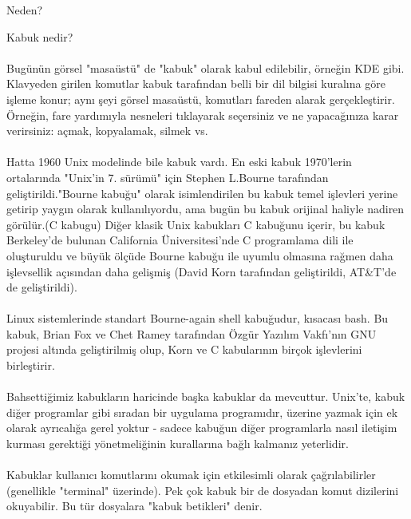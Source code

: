 \documentclass[10pt,a5paper]{book}
\begin{document}
\begin{section}{Neden?}
\begin{subsection}{Kabuk nedir?}
\paragraph{}{Bugünün görsel "masaüstü" de "kabuk" olarak kabul edilebilir, örneğin KDE gibi. Klavyeden girilen komutlar kabuk tarafından belli bir dil bilgisi kuralına göre işleme konur; aynı şeyi görsel masaüstü, komutları fareden alarak gerçekleştirir. Örneğin, fare yardımıyla nesneleri tıklayarak seçersiniz ve ne yapacağınıza karar verirsiniz: açmak, kopyalamak, silmek vs.}
\paragraph{}{Hatta 1960 Unix modelinde bile kabuk vardı. En eski kabuk 1970'lerin ortalarında "Unix'in 7. sürümü" için Stephen L.Bourne tarafından geliştirildi."Bourne kabuğu" olarak isimlendirilen bu kabuk temel işlevleri yerine getirip yaygın olarak kullanılıyordu, ama bugün bu kabuk orijinal haliyle nadiren görülür.(C kabugu) Diğer klasik Unix kabukları C kabuğunu içerir, bu kabuk Berkeley'de bulunan California Üniversitesi'nde C programlama dili ile oluşturuldu ve büyük ölçüde Bourne kabuğu ile uyumlu olmasına rağmen daha işlevsellik açısından daha gelişmiş (David Korn tarafından geliştirildi, AT\&T'de de geliştirildi).}
\paragraph{}{Linux sistemlerinde standart Bourne-again shell kabuğudur, kısacası bash. Bu kabuk, Brian Fox ve Chet Ramey tarafından Özgür Yazılım Vakfı'nın GNU projesi altında geliştirilmiş olup, Korn ve C kabularının birçok işlevlerini
birleştirir.}
\paragraph{}{Bahsettiğimiz kabukların haricinde başka kabuklar da mevcuttur. Unix'te, kabuk diğer programlar gibi sıradan bir uygulama programıdır,
üzerine yazmak için ek olarak ayrıcalığa gerel yoktur - sadece kabuğun diğer programlarla nasıl iletişim kurması gerektiği yönetmeliğinin 
kurallarına bağlı kalmanız yeterlidir.}
\paragraph{}{Kabuklar kullanıcı komutlarını okumak için etkilesimli olarak çağrılabilirler (genellikle "terminal" üzerinde). Pek çok kabuk bir de dosyadan komut dizilerini okuyabilir. Bu tür dosyalara "kabuk betikleri" denir.}

\end{subsection}
\end{section}
\end{document}
